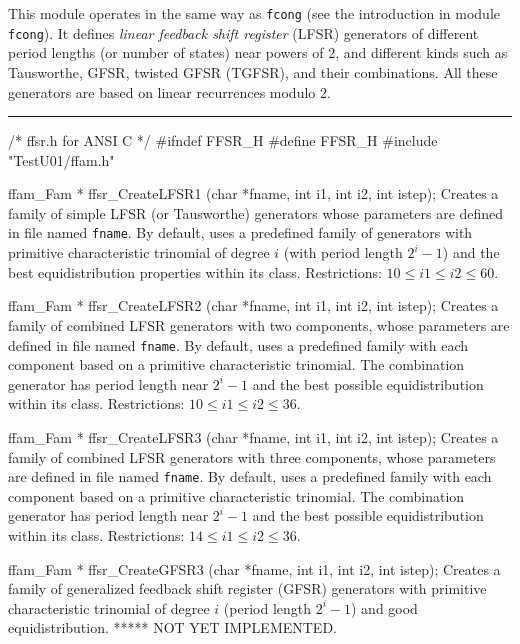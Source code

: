 
This module operates in the same way as {\tt fcong}
(see the introduction in module  {\tt fcong}).
It defines {\em linear feedback shift register\/} (LFSR) generators
of different period lengths (or number of states) near powers of 2,
and different kinds such as Tausworthe, GFSR, twisted GFSR (TGFSR),
and their combinations.
All these generators are based on linear recurrences modulo 2.
%


\bigskip
\hrule
\code\hide
/* ffsr.h  for ANSI C */
#ifndef FFSR_H
#define FFSR_H
\endhide
#include "TestU01/ffam.h"
\endcode



\code

ffam_Fam * ffsr_CreateLFSR1 (char *fname, int i1, int i2, int istep);
\endcode
\tab
 Creates a family of simple LFSR (or Tausworthe) generators whose
 parameters are defined in file named {\tt fname}. By default, uses a
 predefined family of generators with primitive characteristic trinomial of
 degree $i$ (with period length $2^i-1$) and the best equidistribution
 properties within its class.
 Restrictions: $10 \le i1 \le i2 \le 60$.
\endtab
\code


ffam_Fam * ffsr_CreateLFSR2 (char *fname, int i1, int i2, int istep);
\endcode
\tab Creates a family of combined LFSR generators with two components, whose
 parameters are defined in file named {\tt fname}. By default, uses a
 predefined family  with each component
 based on a primitive characteristic trinomial.
 The combination generator has period length near $2^i-1$ and the best
 possible equidistribution within its class.
 Restrictions: $10 \le i1 \le i2 \le 36$.
\endtab
\code


ffam_Fam * ffsr_CreateLFSR3 (char *fname, int i1, int i2, int istep);
\endcode
\tab
 Creates a family of combined LFSR generators with three components, whose
 parameters are defined in file named {\tt fname}. By default, uses a
 predefined family with each component
 based on a primitive characteristic trinomial.
 The combination generator has period length near $2^i-1$ and the best
 possible equidistribution within its class.
 Restrictions: $14 \le i1 \le i2 \le 36$.
\endtab
\code


ffam_Fam * ffsr_CreateGFSR3 (char *fname, int i1, int i2, int istep);
\endcode
\tab
 Creates a family of generalized feedback shift register (GFSR) generators
 with primitive characteristic trinomial of degree $i$
 (period length $2^i-1$) and good equidistribution.
 ***** NOT YET IMPLEMENTED.
\endtab
\code


